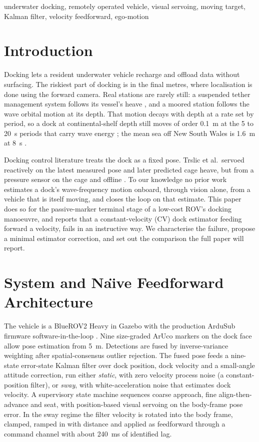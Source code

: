 \documentclass[conference,a4paper]{IEEEtran}
\begin{document}
\begin{IEEEkeywords}
underwater docking, remotely operated vehicle, visual servoing, moving target, Kalman filter, velocity feedforward, ego-motion
\end{IEEEkeywords}

\section{Introduction}

Docking lets a resident underwater vehicle recharge and offload data without surfacing. The riskiest part of docking is in the final metres, where localisation is done using the forward camera. Real stations are rarely still: a suspended tether management system follows its vessel's heave \cite{trslic2020vision}, and a moored station follows the wave orbital motion at its depth. That motion decays with depth at a rate set by period, so a dock at continental-shelf depth still moves of order 0.1~m at the 5 to 20~s periods that carry wave energy \cite{holthuijsen2007waves}; the mean sea off New South Wales is 1.6~m at 8~s \cite{short1992wave}.

Docking control literature treats the dock as a fixed pose. Trslic et al.\ servoed reactively on the latest measured pose \cite{trslic2020vision} and later predicted cage heave, but from a pressure sensor on the cage and offline \cite{trslic2020neuro}. To our knowledge no prior work estimates a dock's wave-frequency motion onboard, through vision alone, from a vehicle that is itself moving, and closes the loop on that estimate. This paper does so for the passive-marker terminal stage of a low-cost ROV's docking manoeuvre, and reports that a constant-velocity (CV) dock estimator feeding forward a velocity, fails in an instructive way. We characterise the failure, propose a minimal estimator correction, and set out the comparison the full paper will report.

\section{System and Na\"{\i}ve Feedforward Architecture}

The vehicle is a BlueROV2 Heavy in Gazebo with the production ArduSub firmware software-in-the-loop \cite{blue2024software}. Nine size-graded ArUco markers \cite{garrido2014automatic} on the dock face allow pose estimation from 5~m. Detections are fused by inverse-variance weighting after spatial-consensus outlier rejection. The fused pose feeds a nine-state error-state Kalman filter over dock position, dock velocity and a small-angle attitude correction, run either \emph{static}, with zero velocity process noise (a constant-position filter), or \emph{sway}, with white-acceleration noise that estimates dock velocity. A supervisory state machine sequences coarse approach, fine align-then-advance and seat, with position-based visual servoing on the body-frame pose error. In the sway regime the filter velocity is rotated into the body frame, clamped, ramped in with distance and applied as feedforward through a command channel with about 240~ms of identified lag.
\end{document}
